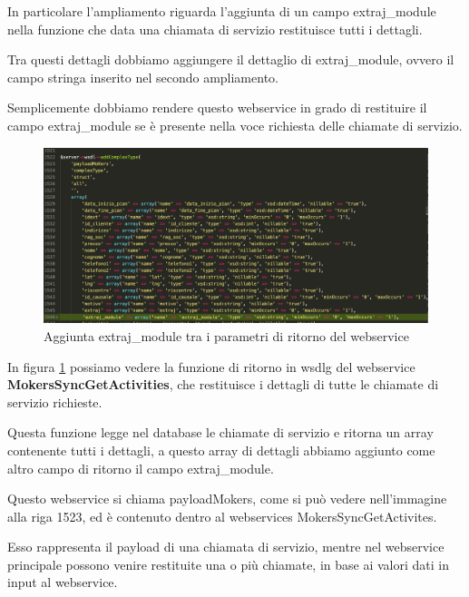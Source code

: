 \begin{flushleft}
	
	In particolare l'ampliamento riguarda l'aggiunta di un campo extraj\_module nella funzione che data una chiamata di servizio restituisce tutti i dettagli.
	
	Tra questi dettagli dobbiamo aggiungere il dettaglio di extraj\_module, ovvero il campo stringa inserito nel secondo ampliamento.
	
	Semplicemente dobbiamo rendere questo webservice in grado di restituire il campo extraj\_module se è presente nella voce richiesta delle chiamate di servizio.
	
\end{flushleft}
\newspace
\begin{figure}[!h] 
	\centering
	\includegraphics[scale = 0.3]{immagini/webservices/ampliamenti/3ampl__types_getCisa.png}
	\caption{Aggiunta extraj\_module tra i parametri di ritorno del webservice}
	\label{fig:5-8}
\end{figure}
\newspace
\begin{flushleft}
	In figura \ref{fig:5-8} possiamo vedere la funzione di ritorno in \gls{wsdlg} del webservice \textbf{MokersSyncGetActivities}, che restituisce i dettagli di tutte le chiamate di servizio richieste. 
	\newspace
	
	Questa funzione legge nel database le chiamate di servizio e ritorna un array contenente tutti i dettagli, a questo array di dettagli abbiamo aggiunto come altro campo di ritorno il campo extraj\_module.
	
	\newspace
	
	Questo webservice si chiama payloadMokers, come si può vedere nell'immagine alla riga 1523, ed è contenuto dentro al webservices MokersSyncGetActivites.
	\newspace
	
	Esso rappresenta il payload di una chiamata di servizio, mentre nel webservice principale possono venire restituite una o più chiamate, in base ai valori dati in input al webservice.
\end{flushleft}

